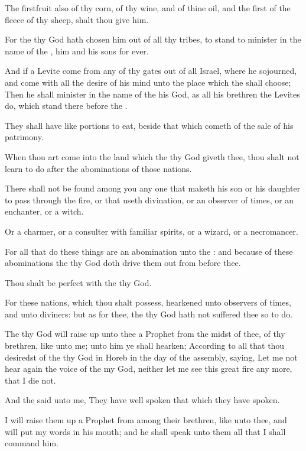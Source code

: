 \verse The firstfruit also of thy corn, of thy wine, and of thine oil, and the first of the fleece of thy sheep, shalt thou give him.

\verse For the \LORD thy God hath chosen him out of all thy tribes, to stand to minister in the name of the \LORD, him and his sons for ever.

\verse And if a Levite come from any of thy gates out of all Israel, where he sojourned, and come with all the desire of his mind unto the place which the \LORD shall choose; \verse Then he shall minister in the name of the \LORD his God, as all his brethren the Levites do, which stand there before the \LORD.

\verse They shall have like portions to eat, beside that which cometh of the sale of his patrimony.

\verse When thou art come into the land which the \LORD thy God giveth thee, thou shalt not learn to do after the abominations of those nations.

\verse There shall not be found among you any one that maketh his son or his daughter to pass through the fire, or that useth divination, or an observer of times, or an enchanter, or a witch.

\verse Or a charmer, or a consulter with familiar spirits, or a wizard, or a necromancer.

\verse For all that do these things are an abomination unto the \LORD: and because of these abominations the \LORD thy God doth drive them out from before thee.

\verse Thou shalt be perfect with the \LORD thy God.

\verse For these nations, which thou shalt possess, hearkened unto observers of times, and unto diviners: but as for thee, the \LORD thy God hath not suffered thee so to do.

\verse The \LORD thy God will raise up unto thee a Prophet from the midst of thee, of thy brethren, like unto me; unto him ye shall hearken; \verse According to all that thou desiredst of the \LORD thy God in Horeb in the day of the assembly, saying, Let me not hear again the voice of the \LORD my God, neither let me see this great fire any more, that I die not.

\verse And the \LORD said unto me, They have well spoken that which they have spoken.

\verse I will raise them up a Prophet from among their brethren, like unto thee, and will put my words in his mouth; and he shall speak unto them all that I shall command him.

